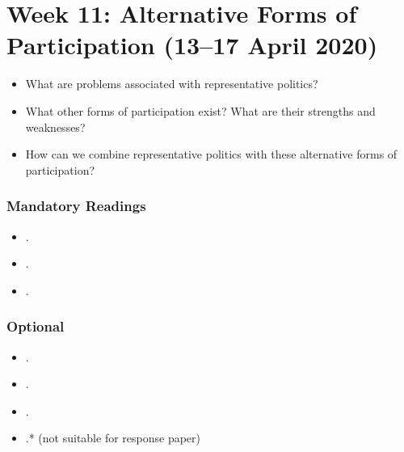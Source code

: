 \documentclass[abstract=on,parskip=full,headings=standardclasses,fontsize=11pt,paper=a4]{scrartcl}
\begin{document}
\section{Week 11: Alternative Forms of Participation (13--17 April 2020)}

\begin{itemize}
\renewcommand\labelitemi{--}
\item What are problems associated with representative politics?
\item What other forms of participation exist? What are their strengths and weaknesses?
\item How can we combine representative politics with these alternative forms of participation?
\end{itemize}

\subsubsection*{Mandatory Readings}
\begin{itemize}
\item {}.
\item {}.
\item {}.
\end{itemize}


\subsubsection*{Optional}
\begin{itemize}
\item {}.
\item {}.
\item {}.
\item {}.* (not suitable for response paper)
\end{itemize}


\sloppy
\renewcommand*{\bibfont}{\small}

\setlength{\bibitemsep}{0.2em} %
\printbibliography
\end{document}
